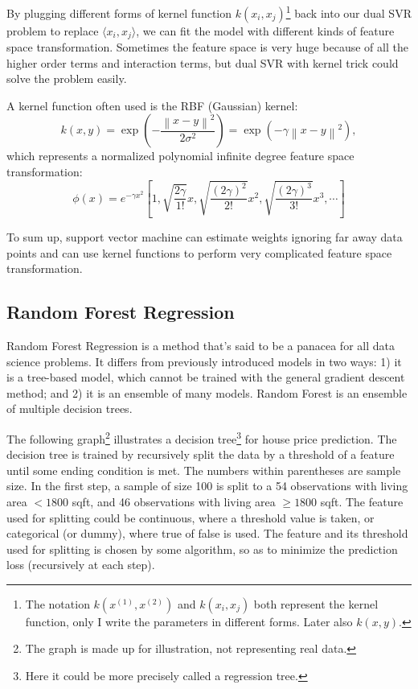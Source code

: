 \documentclass[a4paper]{article}
\newcommand{\norm}[1]{\left\lVert#1\right\rVert}
\begin{document}
By plugging different forms of kernel function $k(x_i, x_j)$\footnote{ The notation $k(x^{(1)}, x^{(2)})$ and $k(x_i, x_j)$ both represent the kernel function, only I write the parameters in different forms. Later also $k(x, y)$. } back into our dual SVR problem to replace $\langle x_i, x_j \rangle$, we can fit the model with different kinds of feature space transformation. Sometimes the feature space is very huge because of all the higher order terms and interaction terms, but dual SVR with kernel trick could solve the problem easily. 

A kernel function often used is the RBF (Gaussian) kernel:
\begin{equation}
  k(x, y) = \exp \left( - \frac{\norm{x-y}^2}{2\sigma^2} \right) = \exp \left( - \gamma \norm{x-y}^2 \right),
\end{equation}
which represents a normalized polynomial infinite degree feature space transformation:
\begin{equation}
 \phi(x) = e^{-\gamma x^2} \left[ 1, \sqrt{\frac{2\gamma}{1!}} x, \sqrt{\frac{(2\gamma)^2}{2!}} x^2, \sqrt{\frac{(2\gamma)^3}{3!}} x^3, \cdots \right]
\end{equation}

To sum up, support vector machine can estimate weights ignoring far away data points and can use kernel functions to perform very complicated feature space transformation.

\subsection{Random Forest Regression}

Random Forest Regression\citep{liaw2002classification} is a method that's said to be a panacea for all data science problems. It differs from previously introduced models in two ways: 1) it is a tree-based model, which cannot be trained with the general gradient descent method; and 2) it is an ensemble of many models. Random Forest is an ensemble of multiple decision trees.

The following graph\footnote{The graph is made up for illustration, not representing real data.} illustrates a decision tree\footnote{Here it could be more precisely called a regression tree.} for house price prediction. The decision tree is trained by recursively split the data by a threshold of a feature until some ending condition is met. The numbers within parentheses are sample size. In the first step, a sample of size 100 is split to a 54 observations with living area $< 1800$ sqft, and 46 observations with living area $\geq 1800$ sqft. The feature used for splitting could be continuous, where a threshold value is taken, or categorical (or dummy), where true of false is used. The feature and its threshold used for splitting is chosen by some algorithm, so as to minimize the prediction loss (recursively at each step). 
\end{document}
